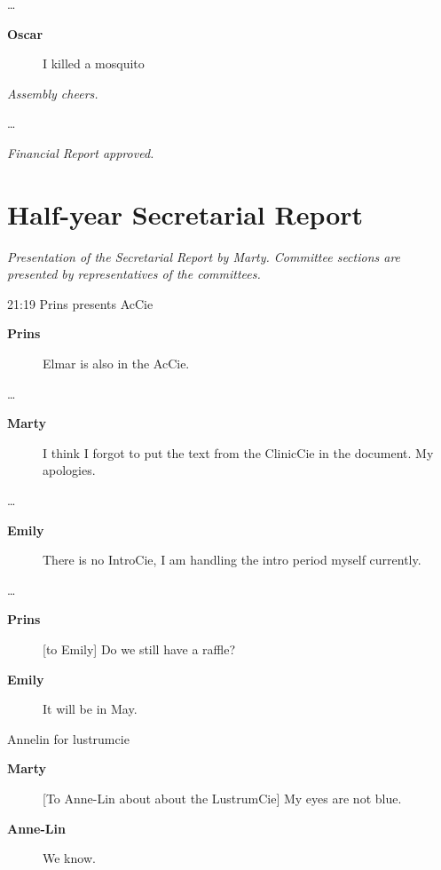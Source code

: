 \documentclass[12pt, a4paper]{article}
\newcommand{\speak}[2]{\begin{description}\item[\textbf{#1}]#2\end{description}}
\begin{document}


\dots

\speak{Oscar}{I killed a mosquito}

\textit{Assembly cheers.}


\dots

\textit{Financial Report approved.}



\section{Half-year Secretarial Report}

\textit{Presentation of the Secretarial Report by Marty. Committee sections are presented by representatives of the committees.}

21:19
Prins presents AcCie

\speak{Prins}{Elmar is also in the AcCie.}



\dots

\speak{Marty}{I think I forgot to put the text from the ClinicCie in the document. My apologies.}

\dots

\speak{Emily}{There is no IntroCie, I am handling the intro period myself currently.}

\dots

\speak{Prins}{[to Emily] Do we still have a raffle?}

\speak{Emily}{It will be in May.}





Annelin for lustrumcie

\speak{Marty}{[To Anne-Lin about about the LustrumCie] My eyes are not blue.}

\speak{Anne-Lin}{We know.}
\end{document}
